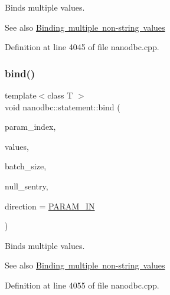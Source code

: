 Binds multiple values. 

\begin{DoxySeeAlso}{See also}
\mbox{\hyperlink{group__bind__multi}{Binding multiple non-\/string values}} 
\end{DoxySeeAlso}


Definition at line 4045 of file nanodbc.\+cpp.

\mbox{\label{group__bind__multi_gadc594c1e061661b7f95639fcf25ec2cb}} 
\subsubsection{\texorpdfstring{bind()}{bind()}\hspace{0.1cm}{\footnotesize\ttfamily [2/6]}}
{\footnotesize\ttfamily template$<$class T $>$ \\
void nanodbc\+::statement\+::bind (\begin{DoxyParamCaption}\item[{short}]{param\+\_\+index,  }\item[{T const $\ast$}]{values,  }\item[{std\+::size\+\_\+t}]{batch\+\_\+size,  }\item[{T const $\ast$}]{null\+\_\+sentry,  }\item[{\mbox{\hyperlink{classnanodbc_1_1statement_a523142f53cbbee8d68a074da993e7fa6}{param\+\_\+direction}}}]{direction = {\ttfamily \mbox{\hyperlink{classnanodbc_1_1statement_a523142f53cbbee8d68a074da993e7fa6ae33f42ce0677d00c291ff4d8e39f99de}{P\+A\+R\+A\+M\+\_\+\+IN}}} }\end{DoxyParamCaption})}



Binds multiple values. 

\begin{DoxySeeAlso}{See also}
\mbox{\hyperlink{group__bind__multi}{Binding multiple non-\/string values}} 
\end{DoxySeeAlso}


Definition at line 4055 of file nanodbc.\+cpp.

\mbox{\label{group__bind__multi_gab7047fdb7cfec9bed6861b9a9c9b98cb}} 

